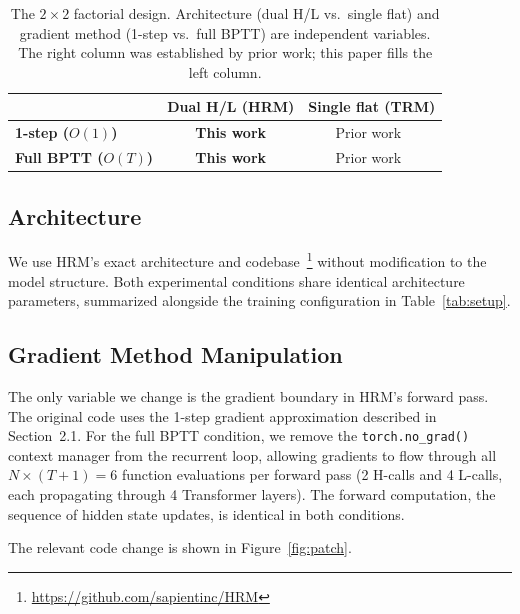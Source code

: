 \documentclass{article}
\begin{document}
\begin{table}[t]
\centering
\caption{The $2\times2$ factorial design. Architecture (dual H/L vs.\ single flat) and gradient method (1-step vs.\ full BPTT) are independent variables. The right column was established by prior work; this paper fills the left column.}
\label{tab:confound}
\begin{tabular}{lcc}
\toprule
& \textbf{Dual H/L (HRM)} & \textbf{Single flat (TRM)} \\
\midrule
\textbf{1-step ($O(1)$)}     & \textbf{This work} & Prior work~\cite{jj2025disentangling} \\
\textbf{Full BPTT ($O(T)$)}  & \textbf{This work} & Prior work~\cite{jj2025disentangling} \\
\bottomrule
\end{tabular}
\end{table}

\subsection{Architecture}

We use HRM's exact architecture and codebase~\footnote{\url{https://github.com/sapientinc/HRM}} without modification to the model structure. Both experimental conditions share identical architecture parameters, summarized alongside the training configuration in Table~\ref{tab:setup}.

\subsection{Gradient Method Manipulation}

The only variable we change is the gradient boundary in HRM's forward pass. The original code uses the 1-step gradient approximation described in Section~2.1. For the full BPTT condition, we remove the \texttt{torch.no\_grad()} context manager from the recurrent loop, allowing gradients to flow through all $N\times(T+1)=6$ function evaluations per forward pass (2 H-calls and 4 L-calls, each propagating through 4 Transformer layers). The forward computation, the sequence of hidden state updates, is identical in both conditions.

The relevant code change is shown in Figure~\ref{fig:patch}.
\end{document}
